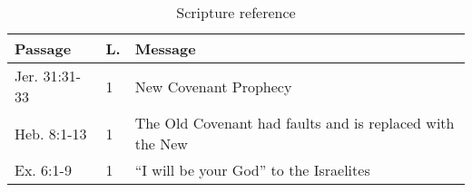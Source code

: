 
\begin{table}[f]%
\centering
\begin{tabular}{llp{11cm}}
\toprule
Passage & L. & Message \\
\midrule
Jer. 31:31-33 & 1 & New Covenant Prophecy\\
Heb. 8:1-13 & 1 & The Old Covenant had faults and is replaced with the New\\
Ex. 6:1-9 & 1 & ``I will be your God'' to the Israelites\\

\bottomrule
\end{tabular}
\caption{Scripture reference}
\label{tab:ScriptureReference}
\end{table}

